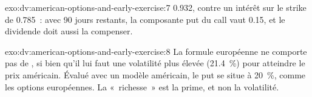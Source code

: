 \begin{solution}{exo:dv:american-options-and-early-exercise:7}
0.932, contre un intérêt sur le strike de 0.785~: avec 90 jours restants, la composante put du call
vaut 0.15, et le dividende doit aussi la compenser.
\end{solution}

\begin{solution}{exo:dv:american-options-and-early-exercise:8}
La formule européenne ne comporte pas de , si bien qu'il lui faut une volatilité plus élevée
(21.4~\%) pour atteindre le prix américain. Évalué avec un modèle américain, le put se situe à 20~\%,
comme les options européennes. La «~richesse~» est la prime, et non la volatilité.
\end{solution}

